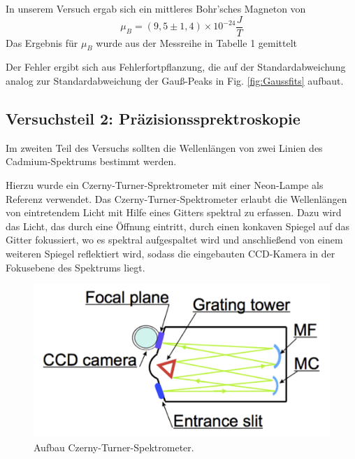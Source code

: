 In unserem Versuch ergab sich ein mittleres Bohr'sches Magneton von
\[
\mu_B = (9,5 \pm 1,4) \times 10^{-24} \frac{J}{T} \tag{a}
\]
Das Ergebnis für $\mu_B$ wurde aus der Messreihe in Tabelle 1 gemittelt

Der Fehler ergibt sich aus Fehlerfortpflanzung, die auf der Standardabweichung analog zur Standardabweichung der Gauß-Peaks in Fig. \ref{fig:Gaussfits} aufbaut.


\subsection{Versuchsteil 2: Präzisionssprektroskopie}

Im zweiten Teil des Versuchs sollten die Wellenlängen von zwei Linien des Cadmium-Spektrums bestimmt werden.

Hierzu wurde ein Czerny-Turner-Sprektrometer mit einer Neon-Lampe als Referenz verwendet.
Das Czerny-Turner-Spektrometer erlaubt die Wellenlängen von eintretendem Licht mit Hilfe eines Gitters spektral zu erfassen. Dazu wird das Licht, das durch eine Öffnung eintritt, durch einen konkaven Spiegel auf das Gitter fokussiert, wo es spektral aufgespaltet wird und anschließend von einem weiteren Spiegel reflektiert wird, sodass die eingebauten CCD-Kamera in der Fokusebene des Spektrums liegt.
\begin{figure}
  \includegraphics[width=\linewidth]{images/CTS.png}
  \caption{\cite{Skript3} Aufbau Czerny-Turner-Spektrometer.}
  \label{fig:CTS}
\end{figure}

